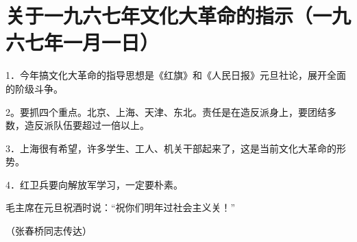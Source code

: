 \section[关于一九六七年文化大革命的指示（一九六七年一月一日）]{关于一九六七年文化大革命的指示（一九六七年一月一日）}


1．今年搞文化大革命的指导思想是《红旗》和《人民日报》元旦社论，展开全面的阶级斗争。

2。要抓四个重点。北京、上海、天津、东北。责任是在造反派身上，要团结多数，造反派队伍要超过一倍以上。

3．上海很有希望，许多学生、工人、机关干部起来了，这是当前文化大革命的形势。

4．红卫兵要向解放军学习，一定要朴素。

毛主席在元旦祝酒时说：“祝你们明年过社会主义关！”

{\raggedleft （张春桥同志传达）\par}



